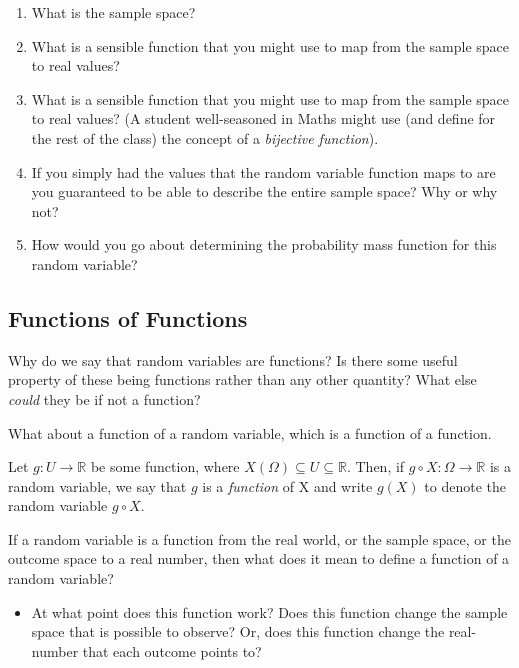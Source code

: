 \documentclass[
  letterpaper,
  DIV=11,
  numbers=noendperiod]{scrreprt}
\providecommand{\tightlist}{%
  \setlength{\itemsep}{0pt}\setlength{\parskip}{0pt}}\usepackage{longtable,booktabs,array}
\begin{document}
\begin{enumerate}
\def\labelenumi{\arabic{enumi}.}
\tightlist
\item
  What is the sample space?
\item
  What is a sensible function that you might use to map from the sample
  space to real values?
\item
  What is a sensible function that you might use to map from the sample
  space to real values? (A student well-seasoned in Maths might use (and
  define for the rest of the class) the concept of a \emph{bijective
  function}).
\item
  If you simply had the values that the random variable function maps to
  are you guaranteed to be able to describe the entire sample space? Why
  or why not?
\item
  How would you go about determining the probability mass function for
  this random variable?
\end{enumerate}

\subsection{Functions of Functions}\label{functions-of-functions}

Why do we say that random variables are functions? Is there some useful
property of these being functions rather than any other quantity? What
else \emph{could} they be if not a function?

What about a function of a random variable, which is a function of a
function.

Let \(g : U \rightarrow \mathbb{R}\) be some function, where
\(X(\Omega) \subseteq U \subseteq \mathbb{R}\). Then, if
\(g \circ X : \Omega \rightarrow \mathbb{R}\) is a random variable, we
say that \(g\) is a \emph{function} of X and write \(g(X)\) to denote
the random variable \(g \circ X\).

If a random variable is a function from the real world, or the sample
space, or the outcome space to a real number, then what does it mean to
define a function of a random variable?

\begin{itemize}
\tightlist
\item
  At what point does this function work? Does this function change the
  sample space that is possible to observe? Or, does this function
  change the real-number that each outcome points to?
\end{itemize}
\end{document}
